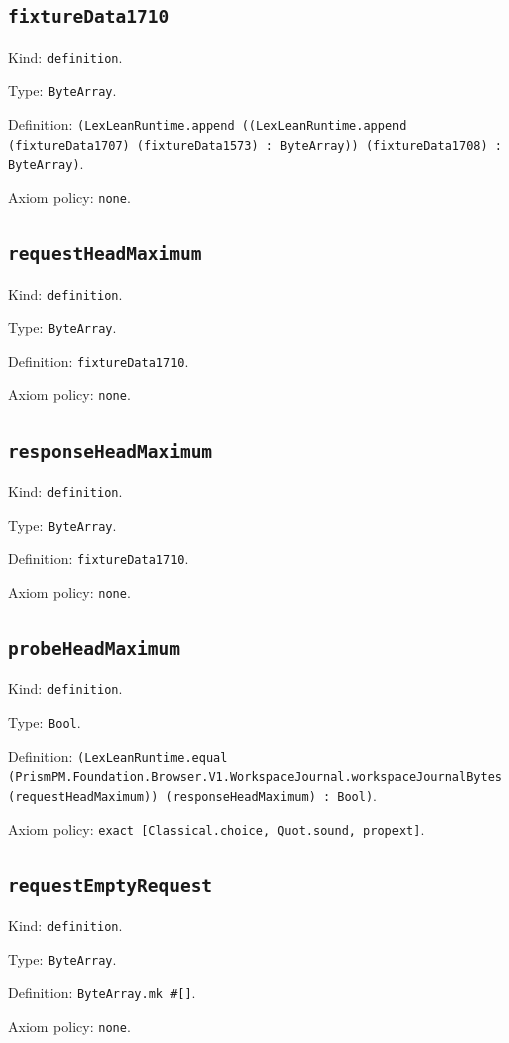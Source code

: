 \documentclass[11pt]{article}
\begin{document}
\subsection*{\texttt{fixtureData1710}}
\noindent Kind: \texttt{definition}.\par
\noindent Type: \texttt{ByteArray}.\par
\noindent Definition: \texttt{(LexLeanRuntime.append ((LexLeanRuntime.append (fixtureData1707) (fixtureData1573) : ByteArray)) (fixtureData1708) : ByteArray)}.\par
\noindent Axiom policy: \texttt{none}.\par
\subsection*{\texttt{requestHeadMaximum}}
\noindent Kind: \texttt{definition}.\par
\noindent Type: \texttt{ByteArray}.\par
\noindent Definition: \texttt{fixtureData1710}.\par
\noindent Axiom policy: \texttt{none}.\par
\subsection*{\texttt{responseHeadMaximum}}
\noindent Kind: \texttt{definition}.\par
\noindent Type: \texttt{ByteArray}.\par
\noindent Definition: \texttt{fixtureData1710}.\par
\noindent Axiom policy: \texttt{none}.\par
\subsection*{\texttt{probeHeadMaximum}}
\noindent Kind: \texttt{definition}.\par
\noindent Type: \texttt{Bool}.\par
\noindent Definition: \texttt{(LexLeanRuntime.equal (PrismPM.Foundation.Browser.V1.WorkspaceJournal.workspaceJournalBytes (requestHeadMaximum)) (responseHeadMaximum) : Bool)}.\par
\noindent Axiom policy: \texttt{exact [Classical.choice, Quot.sound, propext]}.\par
\subsection*{\texttt{requestEmptyRequest}}
\noindent Kind: \texttt{definition}.\par
\noindent Type: \texttt{ByteArray}.\par
\noindent Definition: \texttt{ByteArray.mk \#[]}.\par
\noindent Axiom policy: \texttt{none}.\par
\end{document}
